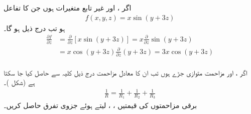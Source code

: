 اگر ،  اور  غیر تابع متغیرات ہوں  جن کا تفاعل
\begin{align*}
f(x,y,z)=x\sin(y+3z)
\end{align*}
ہو تب درج ذیل ہو گا۔
\begin{align*}
\frac{\partial f}{\partial z}&=\frac{\partial}{\partial z}[x\sin(y+3z)]=x\frac{\partial}{\partial z}\sin(y+3z)\\
&=x\cos(y+3z)\frac{\partial}{\partial z}(y+3z)=3x\cos(y+3z)
\end{align*}
\\
اگر ،  اور  مزاحمت متوازی جڑے ہوں  تب ان کا معادل مزاحمت  درج ذیل کلیہ سے حاصل کیا جا سکتا ہے (شکل )۔ 
\begin{align}\label{مساوات_کثیرالمتغیر_متوازی_مزاحمت}
\frac{1}{R}=\frac{1}{R_1}+\frac{1}{R_2}+\frac{1}{R_3}
\end{align}
برقی مزاحمتوں کی قیمتیں ، ،  لیتے ہوئے  جزوی تفرق  حاصل کریں۔

